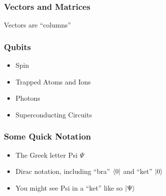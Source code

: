 \documentclass[aspectratio=169]{beamer} %
\begin{document}
\begin{frame}
	\frametitle{Vectors and Matrices}
    Vectors are ``columns''
\end{frame}

%
\begin{frame}
    \frametitle{Qubits}
    \begin{itemize}
    \item Spin
    \item Trapped Atoms and Ions
    \item Photons
    \item Superconducting Circuits\
	\end{itemize}
\end{frame}

\begin{frame}
	\frametitle{Some Quick Notation}
    \begin{itemize}
	\item The Greek letter Psi \begin{math}\Psi\end{math}
    \item Dirac notation, including ``bra'' \begin{math}\bra{0}\end{math} and ``ket'' \begin{math}\ket{0}\end{math}
	\item You might see Psi in a ``ket'' like so \begin{math}\ket{\Psi}\end{math}
    \end{itemize}

\end{frame}

\end{document}
